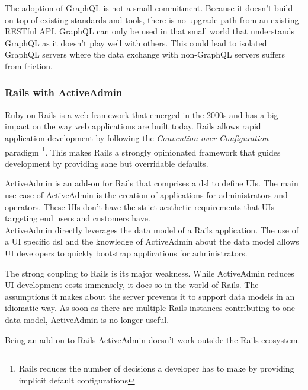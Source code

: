 The adoption of GraphQL is not a small commitment. Because it doesn't build on top of existing standards and tools, there is no upgrade path from an existing RESTful API. GraphQL can only be used in that small world that understands GraphQL as it doesn't play well with others. This could lead to isolated GraphQL servers where the data exchange with non-GraphQL servers suffers from friction.

\subsubsection{Rails with ActiveAdmin}
Ruby on Rails is a web framework that emerged in the 2000s and has a big impact on the way web applications are built today. \citep{rubyonrails} Rails allows rapid application development by following the \textit{Convention over Configuration} paradigm \footnote{Rails reduces the number of decisions a developer has to make by providing implicit default configurations}. This makes Rails a strongly opinionated framework that guides development by providing sane but overridable defaults.

ActiveAdmin is an add-on for Rails that comprises a \gls{dsl} to define UIs. The main use case of ActiveAdmin is the creation of applications for administrators and operators. These UIs don't have the strict aesthetic requirements that UIs targeting end users and customers have. \\
ActiveAdmin directly leverages the data model of a Rails application. The use of a UI specific \gls{dsl} and the knowledge of ActiveAdmin about the data model allows UI developers to quickly bootstrap applications for administrators.

The strong coupling to Rails is its major weakness. While ActiveAdmin reduces UI development costs immensely, it does so in the world of Rails. The assumptions it makes about the server prevents it to support data models in an idiomatic way. As soon as there are multiple Rails instances contributing to one data model, ActiveAdmin is no longer useful.

Being an add-on to Rails ActiveAdmin doesn't work outside the Rails ecosystem.
